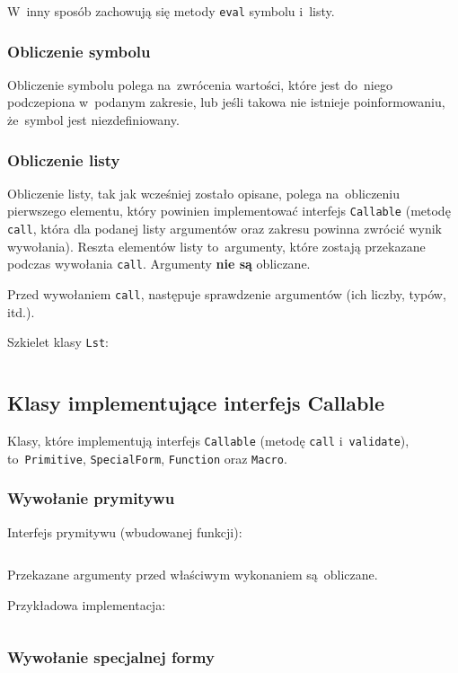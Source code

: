 \documentclass[a4paper,11pt]{article}
\newcommand{\impl}[1]{
\inputminted[fontsize=\footnotesize,frame=single,samepage=true]{java}{impl/#1.java}
}
\begin{document}
W~inny sposób zachowują się metody \verb+eval+ symbolu i~listy.

\subsubsection{Obliczenie symbolu}

Obliczenie symbolu polega na~zwrócenia wartości, które jest do~niego
podczepiona w~podanym zakresie, lub jeśli takowa nie istnieje poinformowaniu,
że~symbol jest niezdefiniowany.

\subsubsection{Obliczenie listy}

Obliczenie listy, tak jak wcześniej zostało opisane, polega na~obliczeniu
pierwszego elementu, który powinien implementować interfejs \verb+Callable+
(metodę \verb+call+, która dla podanej listy argumentów oraz zakresu powinna
zwrócić wynik wywołania). Reszta elementów listy to~argumenty, które zostają
przekazane podczas wywołania \verb+call+. Argumenty \textbf{nie są} obliczane.

Przed wywołaniem \verb+call+, następuje sprawdzenie argumentów (ich liczby,
typów, itd.).

Szkielet klasy \verb+Lst+:
\impl{Lst}

\subsection{Klasy implementujące interfejs Callable}

Klasy, które implementują interfejs \verb+Callable+ (metodę \verb+call+
i~\verb+validate+), to~\verb+Primitive+, \verb+SpecialForm+, \verb+Function+
oraz \verb+Macro+.

\subsubsection{Wywołanie prymitywu}

Interfejs prymitywu (wbudowanej funkcji):
\impl{Primitive}
Przekazane argumenty przed właściwym wykonaniem są~obliczane.

Przykładowa implementacja:
\impl{ConcatPrimitive}

\subsubsection{Wywołanie specjalnej formy}
\end{document}
